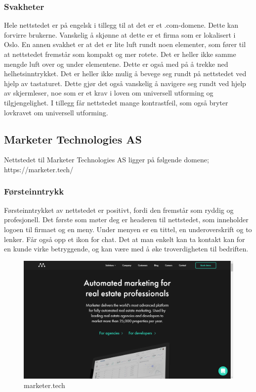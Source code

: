 \subsubsection{Svakheter}
Hele nettstedet er på engelsk i tillegg til at det er et .com-domene. Dette kan forvirre brukerne. Vanskelig å skjønne at dette er et firma som er lokalisert i Oslo. En annen svakhet er at det er lite luft rundt noen elementer, som fører til at nettstedet fremstår som kompakt og mer rotete. Det er heller ikke samme mengde luft over og under elementene. Dette er også med på å trekke ned helhetsinntrykket. Det er heller ikke mulig å bevege seg rundt på nettstedet ved hjelp av tastaturet. Dette gjør det også vanskelig å navigere seg rundt ved hjelp av skjermleser, noe som er et krav i loven om universell utforming og tilgjengelighet. I tillegg får nettstedet mange kontrastfeil, som også bryter lovkravet om universell utforming.

\subsection{Marketer Technologies AS}
Nettstedet til Marketer Technologies AS ligger på følgende domene;
https://marketer.tech/

\subsubsection{Førsteinntrykk}
Førsteinntrykket av nettstedet er positivt, fordi den fremstår som ryddig og profesjonell. Det første som møter deg er headeren til nettstedet, som inneholder logoen til firmaet og en meny. Under menyen er en tittel, en underoverskrift og to lenker. Får også opp et ikon for chat. Det at man enkelt kan ta kontakt kan for en kunde virke betryggende, og kan være med å øke troverdigheten til bedriften.

\begin{figure}[H]
    \centering
    \includegraphics[width=\textwidth]{line/marketer_tech_(1366x768).png}
    \caption{marketer.tech}
    \label{fig:competitors-marketer.tech}
\end{figure}

